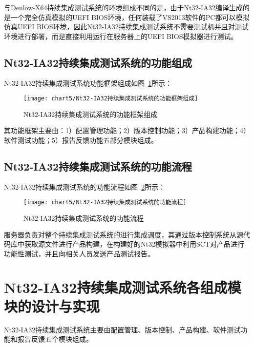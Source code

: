 		与Denlow-X64持续集成测试系统的环境组成不同的是，由于Nt32-IA32编译生成的是一个完全仿真模拟的UEFI BIOS环境，任何装载了VS2013软件的PC都可以模拟仿真UEFI BIOS环境，因此Nt32-IA32持续集成测试系统不需要测试机并且对测试环境进行部署，而是直接利用运行在服务器上的UEFI BIOS模拟器进行测试。
	
	\subsection{Nt32-IA32持续集成测试系统的功能组成}
		
		Nt32-IA32持续集成测试系统功能框架组成如图~\ref{fig:Nt32-IA32持续集成测试系统的功能框架组成}所示：
		
		\begin{figure}[H] %
			\centering
			\texttt{[image: chart5/Nt32-IA32持续集成测试系统的功能框架组成]}
			\caption{Nt32-IA32持续集成测试系统的功能框架组成}
			\label{fig:Nt32-IA32持续集成测试系统的功能框架组成}
		\end{figure}
		
		其功能框架主要由：1）配置管理功能；2）版本控制功能；3）产品构建功能；4）软件测试功能；5）报告反馈功能五部分模块组成。
	
	\subsection{Nt32-IA32持续集成测试系统的功能流程}
		Nt32-IA32持续集成测试系统的功能流程如图~\ref{fig:Nt32-IA32持续集成测试系统的功能流程}所示：
		
		\begin{figure}[H] %
			\centering
			\texttt{[image: chart5/Nt32-IA32持续集成测试系统的功能流程]}
			\caption{Nt32-IA32持续集成测试系统的功能流程}
			\label{fig:Nt32-IA32持续集成测试系统的功能流程}
		\end{figure}
		
		服务器负责对整个持续集成测试系统的进行集成调度，其通过版本控制系统从源代码库中获取源文件进行产品构建，在构建好的Nt32模拟器中利用SCT对产品进行功能性测试，并且向相关人员发送产品测试报告。 

\section{Nt32-IA32持续集成测试系统各组成模块的设计与实现}
	
	Nt32-IA32持续集成测试系统主要由配置管理、版本控制、产品构建、软件测试功能和报告反馈五个模块组成。
	
